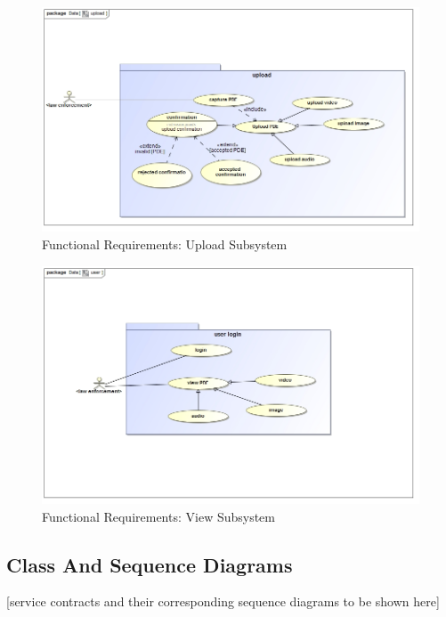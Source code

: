 \documentclass[a4paper,12pt]{article}
\begin{document}
\begin{figure}[H]
\includegraphics[width=1.0\textwidth]{images/upload.jpg}
\caption{Functional Requirements: Upload Subsystem \label{overflow}}
\end{figure}

\begin{figure}[H]
\includegraphics[width=1.0\textwidth]{images/user.jpg}
\caption{Functional Requirements: View Subsystem \label{overflow}}
\end{figure}

\subsection{Class And Sequence Diagrams}
[service contracts and their corresponding sequence diagrams to be shown here]
\end{document}
